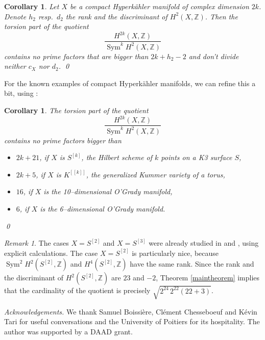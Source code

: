 \documentclass{amsart}
\DeclareMathOperator{\Sym}{Sym}
\newcommand{\Z}{\mathbb{Z}}
\theoremstyle{plain}
\newtheorem{corollary}[theorem]{Corollary}
\theoremstyle{definition}
\theoremstyle{remark}
\newtheorem{remark}[theorem]{Remark}
\begin{document}
\begin{corollary}
Let $X$ be a compact Hyperk\"ahler manifold of complex dimension $2k$. Denote $h_2$ resp.~$d_2$ the rank and the discriminant of $H^2(X,\Z)$. Then the torsion part of the quotient
$$
\frac{H^{2k}(X,\Z)}{\Sym^kH^2(X,\Z)}
$$
contains no prime factors that are bigger than $2k+h_2-2$ and don't divide neither $c_X$ nor $d_2$. \qed
\end{corollary}
For the known examples of compact Hyperk\"ahler manifolds, we can refine this a bit, using \cite[Table~1]{OGrady}:
\begin{corollary}
 The torsion part of the quotient
$$
\frac{H^{2k}(X,\Z)}{\Sym^kH^2(X,\Z)}
$$
contains no prime factors bigger than
\begin{itemize}
\item $2k+21$, if $X$ is $S^{[k]}$, the Hilbert scheme of $k$ points on a K3 surface $S$,
\item $2k+5$, if $X$ is $K^{[[k]]}$, the generalized Kummer variety of a torus,
\item $16$, if $X$ is the 10--dimensional O'Grady manifold,
\item $6$, if $X$ is the 6--dimensional O'Grady manifold.
\end{itemize} \qed
\end{corollary}
\begin{remark}
The cases $X=S^{[2]}$ and $X=S^{[3]}$ were already studied in \cite[Prop.~6.6]{BNS} and \cite[Prop.~2.4]{Kapfer}, using explicit calculations. The case $X=S^{[2]}$ is particularly nice, because $\Sym^2H^2(S^{[2]},\Z)$ and $H^4(S^{[2]},\Z)$ have the same rank. Since the rank and the discriminant of $H^2(S^{[2]},\Z)$ are $23$ and $-2$, Theorem \ref{maintheorem} implies that the cardinality of the quotient is precisely $\sqrt{2^{24}\,2^{22}(22+3)}$.
\end{remark}

\emph{Acknowledgements.} We thank Samuel Boissi\`ere, Cl\'ement Chesseboeuf and K\'evin Tari for useful conversations and the University of Poitiers for its hospitality. The author was supported by a DAAD grant.



\end{document}
